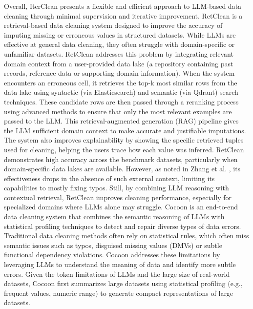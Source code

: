 Overall, IterClean presents a flexible and efficient approach to LLM-based data cleaning through minimal supervision and iterative improvement.
\newline\newline
RetClean \cite{RETCLEAN} is a retrieval-based data cleaning system designed to improve the accuracy of imputing missing or erroneous values in structured datasets. 
While LLMs are effective at general data cleaning, they often struggle with domain-specific or unfamiliar datasets. 
RetClean addresses this problem by integrating relevant domain context from a user-provided data lake (a repository containing past records, reference data or supporting domain information). 
When the system encounters an erroneous cell, it retrieves the top-k most similar rows from the data lake using syntactic (via Elasticsearch) and semantic (via Qdrant) search techniques. 
These candidate rows are then passed through a reranking process using advanced methods to ensure that only the most relevant examples are passed to the LLM. 
This retrieval-augmented generation (RAG) pipeline gives the LLM sufficient domain context to make accurate and justifiable imputations. 
The system also improves explainability by showing the specific retrieved tuples used for cleaning, helping the users trace how each value was inferred. 
RetClean demonstrates high accuracy across the benchmark datasets, particularly when domain-specific data lakes are available. 
However, as noted in Zhang et al. \cite{COCOON}, its effectiveness drops in the absence of such external context, limiting its capabilities to mostly fixing typos. 
Still, by combining LLM reasoning with contextual retrieval, RetClean improves cleaning performance, especially for specialized domains where LLMs alone may struggle.
\newline\newline
Cocoon \cite{COCOON} is an end-to-end data cleaning system that combines the semantic reasoning of LLMs with statistical profiling techniques to detect and repair diverse types of data errors. 
Traditional data cleaning methods often rely on statistical rules, which often miss semantic issues such as typos, disguised missing values (DMVs) or subtle functional dependency violations. 
Cocoon addresses these limitations by leveraging LLMs to understand the meaning of data and identify more subtle errors. 
Given the token limitations of LLMs and the large size of real-world datasets, Cocoon first summarizes large datasets using statistical profiling (e.g., frequent values, numeric range) to generate compact representations of large datasets. 
